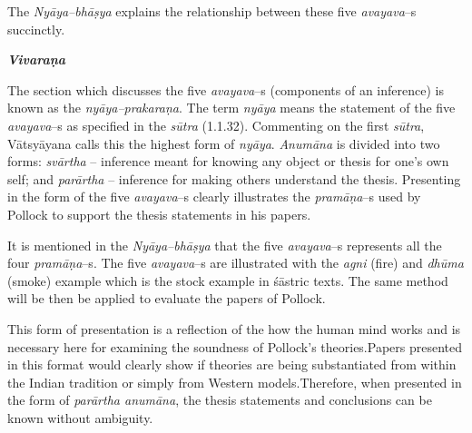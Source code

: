The \textit{Nyāya–bhāṣya} explains the relationship between these five \textit{avayava}–s succinctly.

\textit{\textbf{Vivaraṇa}}

The section which discusses the five \textit{avayava}–s (components of an inference) is known as the \textit{nyāya–prakaraṇa}. The term \textit{nyāya} means the statement of the five \textit{avayava}–s as specified in the \textit{sūtra} (1.1.32). Commenting on the first \textit{sūtra}, Vātsyāyana calls this the highest form of \textit{nyāya}. \textit{Anumāna} is divided into two forms: \textit{svārtha} – inference meant for knowing any object or thesis for one’s own self; and \textit{parārtha} – inference for making others understand the thesis. Presenting in the form of the five \textit{avayava}–s clearly illustrates the \textit{pramāṇa}–s used by Pollock to support the thesis statements in his papers.

It is mentioned in the \textit{Nyāya–bhāṣya} that the five \textit{avayava}–s represents all the four \textit{pramāṇa}–s. The five \textit{avayava}–s are illustrated with the \textit{agni} (fire) and \textit{dhūma} (smoke) example which is the stock example in śāstric texts. The same method will be then be applied to evaluate the papers of Pollock.

This form of presentation is a reflection of the how the human mind works and is necessary here for examining the soundness of Pollock’s theories.Papers presented in this format would clearly show if theories are being substantiated from within the Indian tradition or simply from Western models.Therefore, when presented in the form of \textit{parārtha anumāna}, the thesis statements and conclusions can be known without ambiguity.

\vspace{-.3cm}

